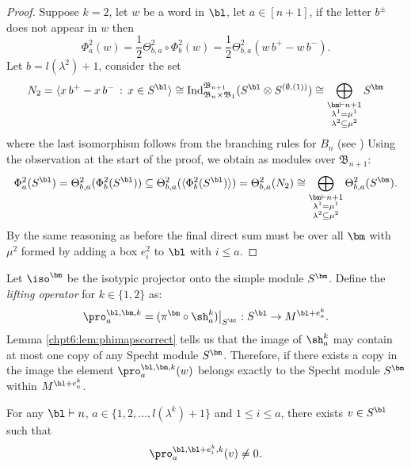 \documentclass[11pt]{report}
\begin{document}
\begin{proof}
	
	Suppose $k=2$, let $w$ be a word in $\bl$, let 
	$a \in 
	[n+1]$, 
	if the letter $b^{\pm}$ does not appear in $w$ then
	\[\Phi_{a}^{2}(w) = \frac{1}{2}\Theta_{b,a}^{2} \circ \Phi_{b}^{2}(w) 
	=\frac{1}{2}\Theta_{b,a}^{2}\left( w \, b^{+} - w \, b^{-}\right) .\]
	Let $b = l(\lambda^{2})+1$, consider the set 
	\[N_{2} = \langle x \, b^{+} - x \, b^{-} \, : \, x \in 
	S^{\bl} 
	\rangle \cong 
	\textnormal{Ind}_{\mathfrak{B}_{n} \times 
		\mathfrak{B}_{1}}^{\mathfrak{B}_{n+1}} ( S^{\bl} \otimes 
	S^{(\emptyset,(1))}) \cong \bigoplus_{\substack{\bm \vdash n+1 \\ \lambda^{1} = \mu^{1} \\\lambda^{2} \subseteq \mu^{2}   }} S^{\bm}\]	
	where the last isomorphism follows from the branching rules for $B_{n}$ (see \cite[Theorem III.2]{geissinger1978representations})	
	Using the observation at the start of the proof,  we obtain as modules over 
	$\mathfrak{B}_{n+1}$: 
	\[\Phi_{a}^{2}(S^{\bl}) =
	\Theta_{b,a}^{2}(\Phi_{b}^{2}(S^{\bl})) 
	\subseteq 
	\Theta_{b,a}^{2}(\langle\Phi_{b}^{2}(S^{\bl})\rangle) =
	\Theta_{b,a}^{2}(N_{2}) \cong \bigoplus_{\substack{ \bm \vdash n+1 \\ \lambda^{1} = \mu^{1} \\ \lambda^{2} \subseteq \mu^{2}   }} \Theta_{b,a}^{2} (S^{\bm}).\]
	By the same reasoning as before the final direct sum must be over all $\bm$ with $\mu^{2}$  formed by adding a box $e_{i}^{2}$ to $\bl$ with $i\leq a$. 
\end{proof}





\begin{defn}
	\label{chpt6:def:proj}
	Let $\iso^{\bm}$ be the isotypic projector onto the simple 
	module $S^{\bm}$. Define the \emph{lifting operator} for 
	$k \in \{1,2\}$ as:
	\begin{align}
	\pro_{a}^{\bl,\bm,k} = (\pi^{\bm} \circ \sh_{a}^{k}) 
	\big|_{S^{\bl}}:S^{\bl} 
	\rightarrow  M^{\bl + e_{a}^{k}} .
	\end{align}
	Lemma \ref{chpt6:lem:phimapscorrect} tells us that the image of $\sh_{a}^{k}$ may contain at most one copy of any Specht module $S^{\bm}$. Therefore, if there exists a copy in the image the element  $\pro_{a}^{\bl,\bm,k}(w)$ belongs exactly to the Specht module $S^{\bm}$ within $M^{\bl + e_{a}^{k}}$.
\end{defn}	

\begin{corollary}
	\label{chpt6:cor:prononzero}
	For any $\bl \vdash n$, $a \in \{1,2,\ldots, l(\lambda^{k})+1\}$ and $1 \leq i\leq a$, there exists $v \in 
	S^{\bl}$ such that
	\[\pro_{a}^{\bl,\bl+e_{i}^{k},k}(v) \neq 	0.\]
\end{corollary}
\end{document}
